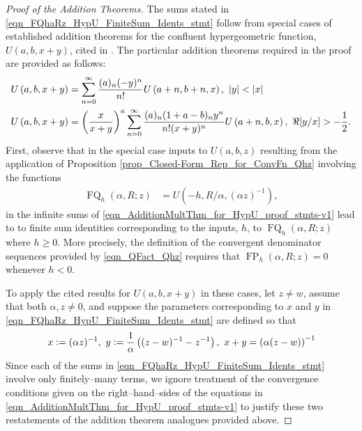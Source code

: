 \documentclass[12pt,reqno]{article}
\numberwithin{sfootnote}{section}
\numberwithin{equation}{section}
\theoremstyle{DefaultTheoremStyle}
\theoremstyle{definition}
\newcommand{\defequals}{\ensuremath{\vcentcolon=}}
\newcommand{\HypU}[3]{\ensuremath{U\left(#1, #2, #3\right)}}
\DeclareMathOperator{\FP}{FP}
\DeclareMathOperator{\FQ}{FQ}
\begin{document}
\begin{proof}[Proof of the Addition Theorems] 
The sums stated in \eqref{eqn_FQhaRz_HypU_FiniteSum_Idents_stmt} 
follow from special cases of established addition theorems for the 
confluent hypergeometric function, $\HypU{a}{b}{x+y}$, cited in 
\citep[\S 13.13(ii)]{NISTHB}. 
The particular addition theorems required in the proof are 
provided as follows: 
\begin{align} 
\label{eqn_AdditionMultThm_for_HypU_proof_stmts-v1} 
\HypU{a}{b}{x+y} & = \sum_{n=0}^{\infty} \frac{(a)_n (-y)^n}{n!} 
     \HypU{a+n}{b+n}{x},\ |y| < |x| \\ 
\notag 
\HypU{a}{b}{x+y} & = \left(\frac{x}{x+y}\right)^{a} \sum_{n=0}^{\infty} 
     \frac{(a)_n (1+a-b)_n y^n}{n! (x+y)^n} \HypU{a+n}{b}{x},\ 
     \Re[y / x] > -\frac{1}{2}. 
\end{align} 
First, 
observe that in the special case inputs to $\HypU{a}{b}{z}$ 
resulting from the application of 
Proposition \ref{prop_Closed-Form_Rep_for_ConvFn_Qhz} 
involving the functions 
\begin{align*} 
\FQ_h(\alpha, R; z) & = \HypU{-h}{R / \alpha}{(\alpha z)^{-1}}, 
\end{align*} 
in the infinite sums of 
\eqref{eqn_AdditionMultThm_for_HypU_proof_stmts-v1} 
lead to to finite sum identities corresponding to the inputs, $h$, to 
$\FQ_h(\alpha, R; z)$ where $h \geq 0$. 
More precisely, the definition of the convergent denominator sequences 
provided by \eqref{eqn_QFact_Qhz} requires that 
$\FP_h(\alpha, R; z) = 0$ whenever $h < 0$. 

To apply the cited results for $\HypU{a}{b}{x+y}$ in these cases, 
let $z \neq w$, assume that both $\alpha, z \neq 0$, and 
suppose the parameters corresponding to $x$ and $y$ 
in \eqref{eqn_FQhaRz_HypU_FiniteSum_Idents_stmt} are defined so that 
\begin{equation} 
\label{eqn_AdditionMultThm_analogues_proof_stmt-v1} 
x \defequals (\alpha z)^{-1},\ 
y \defequals \frac{1}{\alpha}\left((z-w)^{-1} - z^{-1}\right),\ 
x + y = \left(\alpha (z-w)\right)^{-1} 
\end{equation} 
Since each of the sums in \eqref{eqn_FQhaRz_HypU_FiniteSum_Idents_stmt} 
involve only finitely--many terms, 
we ignore treatment of the convergence conditions given on the 
right--hand--sides of the equations in 
\eqref{eqn_AdditionMultThm_for_HypU_proof_stmts-v1} 
to justify these two restatements of the addition theorem analogues 
provided above. 
\end{proof} 
\end{document}
